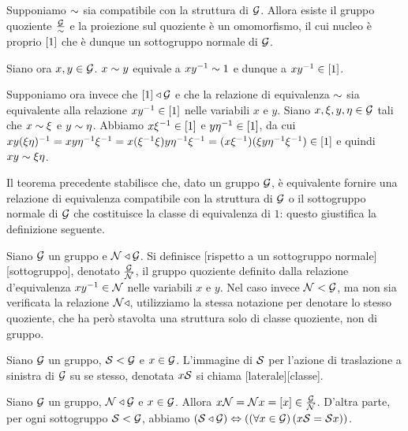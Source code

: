 \Proof Supponiamo $\Equivalence$ sia compatibile con la struttura di $\mathcal{G}$. Allora esiste il gruppo quoziente $\Quotient{\Group}{\Equivalence}$ e la proiezione sul quoziente \`e un omomorfismo, il cui nucleo \`e proprio $\EquivalenceClass{1}$ che \`e dunque un sottogruppo normale di $\mathcal{G}$.
\par Siano ora $x, y \in \mathcal{G}$. $x \Equivalence y$ equivale a $xy^{-1} \Equivalence 1$ e dunque a $xy^{-1} \in \EquivalenceClass{1}$.
\par Supponiamo ora invece che $\EquivalenceClass{1} \IsNormalSubgroup \Group$ e che la relazione di equivalenza $\Equivalence$ sia equivalente alla relazione $xy^{-1} \in \EquivalenceClass{1}$ nelle variabili $x$ e $y$. Siano $x, \xi, y, \eta \in \mathcal{G}$ tali che $x \Equivalence \xi$ e $y \Equivalence \eta$. Abbiamo $x \xi^{-1} \in \EquivalenceClass{1}$ e $y \eta^{-1} \in \EquivalenceClass{1}$, da cui $xy(\xi\eta)^{-1} = xy\eta^{-1}\xi^{-1} = x (\xi^{-1}\xi) y\eta^{-1}\xi^{-1} = (x\xi^{-1}) (\xi y\eta^{-1}\xi^{-1}) \in \EquivalenceClass{1}$ e quindi $xy \Equivalence \xi\eta$. \EndProof
\par Il teorema precedente stabilisce che, dato un gruppo $\mathcal{G}$, \`e equivalente fornire una relazione di equivalenza compatibile con la struttura di $\mathcal{G}$ o il sottogruppo normale di $\mathcal{G}$ che costituisce la classe di equivalenza di $1$: questo giustifica la definizione seguente.
\begin{Definition}
	Siano $\mathcal{G}$ un gruppo e $\mathcal{N} \triangleleft \mathcal{G}$. Si definisce [rispetto a un sottogruppo normale][sottogruppo], denotato $\frac{\mathcal{G}}{\mathcal{N}}$, il gruppo quoziente definito dalla relazione d'equivalenza $xy^{-1} \in \mathcal{N}$ nelle variabili $x$ e $y$.
	Nel caso invece $\mathcal{N} < \mathcal{G}$, ma non sia verificata la relazione $\mathcal{N} \triangleleft$, utilizziamo la stessa notazione per denotare lo stesso quoziente, che ha per\`o stavolta una struttura solo di classe quoziente, non di gruppo.
\end{Definition}
\begin{Definition}
	Siano $\mathcal{G}$ un gruppo, $\mathcal{S} < \mathcal{G}$ e $x \in \mathcal{G}$. L'immagine di $\mathcal{S}$ per l'azione di traslazione a sinistra di $\mathcal{G}$ su se stesso, denotata $x\mathcal{S}$ si chiama [laterale][classe].
\end{Definition}
\begin{Theorem}
	Siano $\mathcal{G}$ un gruppo, $\mathcal{N} \triangleleft \mathcal{G}$ e $x \in \mathcal{G}$. Allora $\Coset{x}{\NormalSubgroup} = \RightCoset{\NormalSubgroup}{x} = \EquivalenceClass{x} \in \Quotient{\Group}{\NormalSubgroup}$. D'altra parte, per ogni sottogruppo $\mathcal{S} < \mathcal{G}$, abbiamo $\left ( \mathcal{S} \triangleleft \mathcal{G} \right ) \Leftrightarrow \left ( \left ( \forall x \in \mathcal{G} \right ) \left ( x\mathcal{S} = \mathcal{S} x \right ) \right )$.
\end{Theorem}
